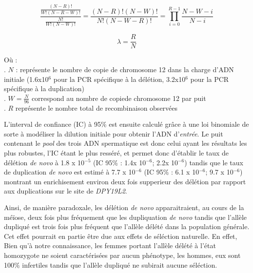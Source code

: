 \documentclass[12pt,twoside]{reedthesis}
\theoremstyle{definition}
\theoremstyle{definition}
\theoremstyle{remark}
\begin{document}
  \begin{equation} 
  \frac{\frac{(N - R)!}{W!(N-R-W)!}}{\frac{N!}{W!(N-W)!}} = \frac{(N-R)!(N-W)!}{N!(N-W-R)!} = \prod_{i=0}^{R-1}{\frac{N-W-i}{N-i}}
  \label{eq:hypergeo}
  \end{equation}
  
  \begin{equation} 
  \lambda = \frac{R}{N}
  \label{eq:lambda}
  \end{equation}
  
  Où :\\
  . \(N\) : représente le nombre de copie de chromosome 12 dans la charge
  d'ADN initiale (1.6x10\({^6}\) pour la PCR spécifique à la délétion,
  3.2x10\({^6}\) pour la PCR spécifique à la duplication)\\
  . \(W = \frac{N}{96}\) correspond au nombre de copiede chromosome 12 par
  puit\\
  . \(R\) représente le nombre total de recombinaison observées
  
  L'interval de confiance (IC) à 95\% est ensuite calculé grâce à une loi
  binomiale de sorte à modéliser la dilution initiale pour obtenir l'ADN
  d'\emph{entrée}. Le puit contenant le \emph{pool} des trois ADN
  spermatique est donc celui ayant les résultats les plus robustes, l'IC
  étant le plus resséré, et permet donc d'établir le taux de délétion
  \emph{de novo} à 1.8 x 10\(^{-5}\) (IC 95\% : 1.4x 10\(^{-6}\); 2.2x
  10\(^{-6}\)) tandis que le taux de duplication \emph{de novo} est estimé
  à 7.7 x 10\(^{-6}\) (IC 95\% : 6.1 x 10\(^{-6}\); 9.7 x 10\(^{-6}\))
  montrant un enrichisement environ deux fois supperieur des délétion par
  rapport aux duplications sur le site de \emph{DPY19L2}.
  
  Ainsi, de manière paradoxale, les délétion \emph{de novo}
  apparaitraient, au cours de la méïose, deux fois plus fréquement que les
  dupliquation \emph{de novo} tandis que l'allèle dupliqué est trois fois
  plus fréquent que l'allèle délété dans la population générale. Cet effet
  pourrait en partie être due aux effets de séléction naturelle. En effet,
  Bien qu'à notre connaissance, les femmes portant l'allèle délété à
  l'état homozygote ne soient caractérisées par aucun phénotype, les
  hommes, eux sont 100\% infertiles tandis que l'allèle dupliqué ne
  subirait aucune séléction.
  
\end{document}
